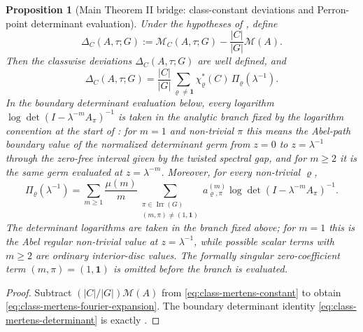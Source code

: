 \documentclass[11pt,a4paper]{amsart}
\theoremstyle{plain}
\newtheorem{proposition}[theorem]{Proposition}
\theoremstyle{definition}
\theoremstyle{remark}
\DeclareMathOperator{\Irr}{Irr}
\begin{document}
\begin{proposition}[Main Theorem II bridge: class-constant deviations
  and Perron-point determinant evaluation]
  \label{prop:class-mertens-deviations}
  Under the hypotheses of , define
  \[
    \Delta_C(A,\tau;G)
    :=\mathcal M_C(A,\tau;G)-\frac{|C|}{|G|}\mathcal M(A).
  \]
  Then the classwise deviations \(\Delta_C(A,\tau;G)\) are well
  defined, and
  \begin{equation}\label{eq:class-mertens-fourier-expansion}
    \Delta_C(A,\tau;G)
    =
    \frac{|C|}{|G|}
      \sum_{\varrho\neq\mathbf 1}
        \chi_\varrho^\ast(C)\,\Pi_\varrho(\lambda^{-1}).
  \end{equation}
  In the boundary determinant evaluation below, every logarithm
  \(\log\det(I-\lambda^{-m}A_\pi)^{-1}\) is taken in the analytic
  branch fixed by the logarithm convention at the start of
  : for \(m=1\) and non-trivial \(\pi\) this
  means the Abel-path boundary value of the normalized determinant germ
  from \(z=0\) to \(z=\lambda^{-1}\) through the zero-free interval given by
  the twisted spectral gap, and for \(m\ge 2\) it is the same germ evaluated
  at \(z=\lambda^{-m}\).
  Moreover, for every non-trivial \(\varrho\),
  \begin{equation}\label{eq:class-mertens-determinant}
    \Pi_\varrho(\lambda^{-1})
    =
    \sum_{m\ge 1}\frac{\mu(m)}{m}
      \sum_{\substack{\pi\in\Irr(G)\\(m,\pi)\neq(1,\mathbf 1)}}
        a_{\varrho,\pi}^{(m)}
        \log\det(I-\lambda^{-m}A_\pi)^{-1}.
  \end{equation}
  The determinant logarithms are taken in the branch fixed above; for
  \(m=1\) this is the Abel regular non-trivial value at \(z=\lambda^{-1}\),
  while possible scalar terms with \(m\ge2\) are ordinary interior-disc
  values.  The formally singular zero-coefficient term
  \((m,\pi)=(1,\mathbf1)\) is omitted before the branch is evaluated.
\end{proposition}

\begin{proof}
  Subtract \((|C|/|G|)\mathcal M(A)\) from
  \eqref{eq:class-mertens-constant} to obtain
  \eqref{eq:class-mertens-fourier-expansion}.
  The boundary determinant identity
  \eqref{eq:class-mertens-determinant} is exactly
  .
\end{proof}
\end{document}
